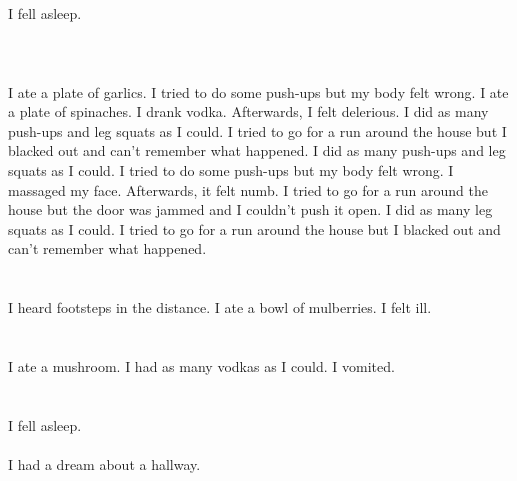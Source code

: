 \documentclass{article}
\begin{document}
    \section{}
    I fell asleep.\\\\ 
    \newpage
    
    \section{}
    I ate a plate of garlics. I tried to do some push-ups but my body felt wrong. I ate a plate of spinaches. I drank vodka. Afterwards, I felt delerious.  I did as many push-ups and leg squats as I could.  I tried to go for a run around the house but I blacked out and can't remember what happened.  I did as many push-ups and leg squats as I could.  I tried to do some push-ups but my body felt wrong.   I massaged my face. Afterwards, it felt numb.  I tried to go for a run around the house but the door was jammed and I couldn't push it open.  I did as many leg squats as I could.  I tried to go for a run around the house but I blacked out and can't remember what happened.  
    \newpage
    
    \section{}
    I heard footsteps in the distance. I ate a bowl of mulberries. I felt ill.  
    \newpage
    
    \section{}
    I ate a mushroom. I had as many vodkas as I could. I vomited.  
    \newpage
    
    \section{}
    I fell asleep.\\\\I had a dream about a hallway.\\\\ 
    \newpage
    
\end{document}
